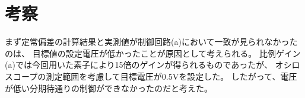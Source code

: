 \documentclass[uplatex, 11pt,a4j, titlepage]{jsarticle}
\begin{document}
\section{考察}

まず定常偏差の計算結果と実測値が制御回路(a)において一致が見られなかったのは、
目標値の設定電圧が低かったことが原因として考えられる。
比例ゲイン(a)では今回用いた素子により15倍のゲインが得られるものであったが、
オシロスコープの測定範囲を考慮して目標電圧が0.5Vを設定した。
したがって、電圧が低い分期待通りの制御ができなかったのだと考えた。


\newpage
\thispagestyle{empty}
\nocite{Material}


\end{document}
